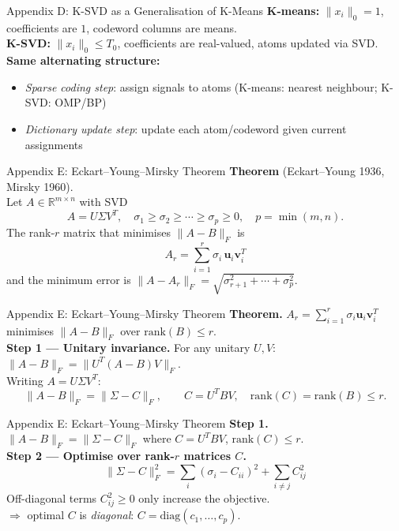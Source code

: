 \documentclass{beamer}
\begin{document}
\begin{frame}{Appendix D: K-SVD as a Generalisation of K-Means}
\textbf{K-means:} $\|x_i\|_0=1$, coefficients are $1$, codeword columns are means.\\[0.3em]
\textbf{K-SVD:} $\|x_i\|_0\leq T_0$, coefficients are real-valued, atoms updated via SVD.\\[0.5em]
\textbf{Same alternating structure:}
\begin{itemize}
    \item \textit{Sparse coding step}: assign signals to atoms (K-means: nearest neighbour; K-SVD: OMP/BP)
    \item \textit{Dictionary update step}: update each atom/codeword given current assignments
\end{itemize}
\end{frame}


\begin{frame}{Appendix E: Eckart--Young--Mirsky Theorem}
\textbf{Theorem} (Eckart--Young 1936, Mirsky 1960).\\[0.4em]
Let $A\in\mathbb{R}^{m\times n}$ with SVD
\[
A = U\Sigma V^T, \quad \sigma_1\geq\sigma_2\geq\cdots\geq\sigma_p\geq 0,\quad p=\min(m,n).
\]
The rank-$r$ matrix that minimises $\|A-B\|_F$ is
\[
A_r = \sum_{i=1}^{r}\sigma_i\,\mathbf{u}_i\mathbf{v}_i^T
\]
and the minimum error is $\|A-A_r\|_F = \sqrt{\sigma_{r+1}^2+\cdots+\sigma_p^2}$.\\[0.4em]
\end{frame}

\begin{frame}{Appendix E: Eckart--Young--Mirsky Theorem}
\textbf{Theorem.} $A_r = \sum_{i=1}^{r}\sigma_i\mathbf{u}_i\mathbf{v}_i^T$ minimises $\|A-B\|_F$ over $\mathrm{rank}(B)\leq r$.\\[0.5em]
\textbf{Step 1 — Unitary invariance.}
For any unitary $U,V$: $\|A-B\|_F = \|U^T(A-B)V\|_F$.\\[0.3em]
Writing $A=U\Sigma V^T$:
\[
\|A-B\|_F = \|\Sigma - C\|_F, \qquad C = U^TBV,\quad \mathrm{rank}(C)=\mathrm{rank}(B)\leq r.
\]
\end{frame}

\begin{frame}{Appendix E: Eckart--Young--Mirsky Theorem}
\textbf{Step 1.} $\|A-B\|_F = \|\Sigma-C\|_F$ where $C=U^TBV$, $\mathrm{rank}(C)\leq r$.\\[0.5em]
\textbf{Step 2 — Optimise over rank-$r$ matrices $C$.}
\[
\|\Sigma - C\|_F^2 = \sum_{i}(\sigma_i-C_{ii})^2 + \sum_{i\neq j}C_{ij}^2
\]
Off-diagonal terms $C_{ij}^2\geq 0$ only increase the objective.\\
$\Rightarrow$ optimal $C$ is \emph{diagonal}: $C=\mathrm{diag}(c_1,\ldots,c_p)$.\\[0.3em]
\phantom{Among diagonal rank-$r$ matrices: at most $r$ entries $c_i$ are nonzero.}
\[
\phantom{\min_{c:\;\#\{c_i\neq0\}\leq r}\;\sum_i(\sigma_i-c_i)^2}
\]
\end{frame}
\end{document}
